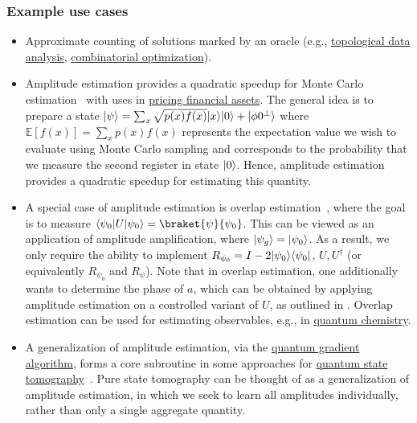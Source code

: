 \begin{refsection}
\subsubsection*{Example use cases}
\begin{itemize}
    \item Approximate counting of solutions marked by an oracle (e.g., \hyperref[appl:TDA]{topological data analysis}, \hyperref[appl:CombOpt]{combinatorial optimization}).
    \item Amplitude estimation provides a quadratic speedup for Monte Carlo estimation~\cite{montanaro2015QMonteCarlo, kothari2022MonteCarlo} with uses in \hyperref[appl:OptionsPricing]{pricing financial assets}. The general idea is to prepare a state $\lvert\psi\rangle = \sum_x \sqrt{p(x) f(x)} \lvert x\rangle\lvert0\rangle + \lvert\phi 0^\perp\rangle$ where $\mathbb{E}[f(x)] = \sum_x p(x) f(x)$ represents the expectation value we wish to evaluate using Monte Carlo sampling and corresponds to the probability that we measure the second register in state $\lvert0\rangle$. Hence, amplitude estimation provides a quadratic speedup for estimating this quantity. 
    \item A special case of amplitude estimation is overlap estimation~\cite{knill2007ObservableMeasurement}, where the goal is to measure $\bra{\psi_0} U \ket{\psi_0} = \braket{\psi}{\psi_0}$. This can be viewed as an application of amplitude amplification, where $\lvert\psi_g\rangle = \lvert\psi_0\rangle$. As a result, we only require the ability to implement $R_{\psi_0} = I - 2\lvert\psi_0\rangle\langle\psi_0\rvert$, $U, U^\dag$ (or equivalently $R_{\psi_0}$ and $R_{\psi}$). Note that in overlap estimation, one additionally wants to determine the phase of $a$, which can be obtained by applying amplitude estimation on a controlled variant of $U$, as outlined in \cite{knill2007ObservableMeasurement}. Overlap estimation can be used for estimating observables, e.g., in \hyperref[appl:QuantumChemistry]{quantum chemistry}. 
    \item A generalization of amplitude estimation, via the \hyperref[prim:GradientEstimation]{quantum gradient algorithm}, forms a core subroutine in some approaches for \hyperref[prim:Tomography]{quantum state tomography}~\cite{apeldoorn2022TomographyStatePreparationUnitaries}. Pure state tomography can be thought of as a generalization of amplitude estimation, in which we seek to learn all amplitudes individually, rather than only a single aggregate quantity.
\end{itemize}




\end{refsection}
